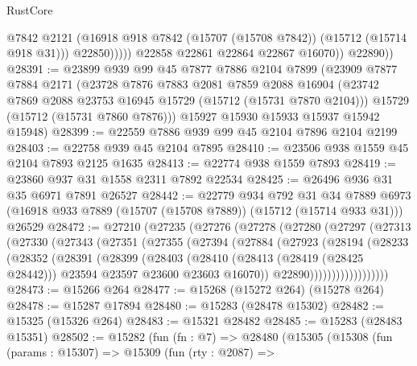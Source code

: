 \begin{lexlean}{RustCore}
\begin{coremodule}
                      @7842
                      @2121
                      (@16918 @918 @7842 (@15707 (@15708 @7842)) (@15712 (@15714 @918 @31)))
                      @22850)))))
            @22858
            @22861
            @22864
            @22867
            @16070))
        @22890))
@28391 := @23899
    @939
    @99
    @45
    @7877
    @7886
    @2104
    @7899
    (@23909
      @7877
      @7884
      @2171
      (@23728
        @7876
        @7883
        @2081
        @7859
        @2088
        @16904
        (@23742 @7869 @2088 @23753 @16945 @15729 (@15712 (@15731 @7870 @2104)))
        @15729
        (@15712 (@15731 @7860 @7876)))
      @15927
      @15930
      @15933
      @15937
      @15942
      @15948)
@28399 := @22559 @7886 @939 @99 @45 @2104 @7896 @2104 @2199
@28403 := @22758 @939 @45 @2104 @7895
@28410 := @23506 @938 @1559 @45 @2104 @7893 @2125 @1635
@28413 := @22774 @938 @1559 @7893
@28419 := @23860 @937 @31 @1558 @2311 @7892 @22534
@28425 := @26496 @936 @31 @35 @6971 @7891 @26527
@28442 := @22779
    @934
    @792
    @31
    @34
    @7889
    @6973
    (@16918 @933 @7889 (@15707 (@15708 @7889)) (@15712 (@15714 @933 @31)))
    @26529
@28472 := @27210
    (@27235
      (@27276
        (@27278
          (@27280
            (@27297
              (@27313
                (@27330
                  (@27343
                    (@27351
                      (@27355
                        (@27394
                          (@27884
                            (@27923
                              (@28194
                                (@28233
                                  (@28352
                                    (@28391
                                      (@28399
                                        (@28403
                                          (@28410
                                            (@28413 (@28419 (@28425 @28442)))
                                            @23594
                                            @23597
                                            @23600
                                            @23603
                                            @16070))
                                        @22890))))))))))))))))))
@28473 := @15266 @264
@28477 := @15268 (@15272 @264) (@15278 @264)
@28478 := @15287 @17894
@28480 := @15283 (@28478 @15302)
@28482 := @15325 (@15326 @264)
@28483 := @15321 @28482
@28485 := @15283 (@28483 @15351)
@28502 := @15282
    (fun (fn : @7) =>
    @28480
      (@15305
        (@15308
          (fun (params : @15307) =>
          @15309
            (fun (rty : @2087) =>

\end{coremodule}
\end{lexlean}
